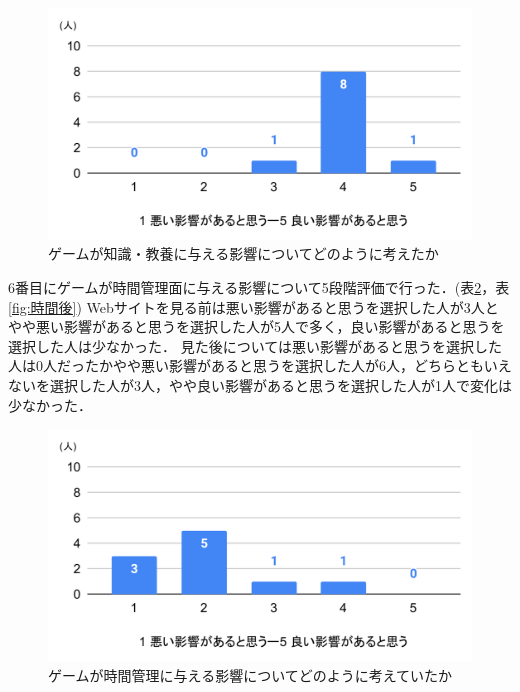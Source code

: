 \documentclass[12pt,a4j,titlepage]{ltjsarticle}
\begin{document}
\begin{figure}[H]
 \begin{center}
  \includegraphics[keepaspectratio, scale=0.5]{知識後.pdf}
 \end{center}
 \caption{ゲームが知識・教養に与える影響についてどのように考えたか}
 \label{fig:知識後}
\end{figure}

6番目にゲームが時間管理面に与える影響について5段階評価で行った．(表\ref{fig:時間前}，表\ref{fig:時間後})
Webサイトを見る前は悪い影響があると思うを選択した人が3人とやや悪い影響があると思うを選択した人が5人で多く，良い影響があると思うを選択した人は少なかった．
見た後については悪い影響があると思うを選択した人は0人だったかやや悪い影響があると思うを選択した人が6人，どちらともいえないを選択した人が3人，やや良い影響があると思うを選択した人が1人で変化は少なかった．

\begin{figure}[H]
 \begin{center}
  \includegraphics[keepaspectratio, scale=0.5]{時間前.pdf}
 \end{center}
 \caption{ゲームが時間管理に与える影響についてどのように考えていたか}
 \label{fig:時間前}
\end{figure}
\end{document}
